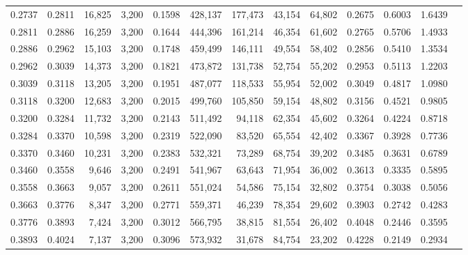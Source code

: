 \begin{tabular}{rrrrrrrrrrrrr}
0.2737 & 0.2811 & 16,825 & 3,200 &                                     0.1598 & 428,137 & 177,473 &  43,154 &  64,802 & 0.2675 & 0.6003 & 1.6439 \\
0.2811 & 0.2886 & 16,259 & 3,200 &                                     0.1644 & 444,396 & 161,214 &  46,354 &  61,602 & 0.2765 & 0.5706 & 1.4933 \\
0.2886 & 0.2962 & 15,103 & 3,200 &                                     0.1748 & 459,499 & 146,111 &  49,554 &  58,402 & 0.2856 & 0.5410 & 1.3534 \\
0.2962 & 0.3039 & 14,373 & 3,200 &                                     0.1821 & 473,872 & 131,738 &  52,754 &  55,202 & 0.2953 & 0.5113 & 1.2203 \\
0.3039 & 0.3118 & 13,205 & 3,200 &                                     0.1951 & 487,077 & 118,533 &  55,954 &  52,002 & 0.3049 & 0.4817 & 1.0980 \\
0.3118 & 0.3200 & 12,683 & 3,200 &                                     0.2015 & 499,760 & 105,850 &  59,154 &  48,802 & 0.3156 & 0.4521 & 0.9805 \\
0.3200 & 0.3284 & 11,732 & 3,200 &                                     0.2143 & 511,492 &  94,118 &  62,354 &  45,602 & 0.3264 & 0.4224 & 0.8718 \\
0.3284 & 0.3370 & 10,598 & 3,200 &                                     0.2319 & 522,090 &  83,520 &  65,554 &  42,402 & 0.3367 & 0.3928 & 0.7736 \\
0.3370 & 0.3460 & 10,231 & 3,200 &                                     0.2383 & 532,321 &  73,289 &  68,754 &  39,202 & 0.3485 & 0.3631 & 0.6789 \\
0.3460 & 0.3558 &  9,646 & 3,200 &                                     0.2491 & 541,967 &  63,643 &  71,954 &  36,002 & 0.3613 & 0.3335 & 0.5895 \\
0.3558 & 0.3663 &  9,057 & 3,200 &                                     0.2611 & 551,024 &  54,586 &  75,154 &  32,802 & 0.3754 & 0.3038 & 0.5056 \\
0.3663 & 0.3776 &  8,347 & 3,200 &                                     0.2771 & 559,371 &  46,239 &  78,354 &  29,602 & 0.3903 & 0.2742 & 0.4283 \\
0.3776 & 0.3893 &  7,424 & 3,200 &                                     0.3012 & 566,795 &  38,815 &  81,554 &  26,402 & 0.4048 & 0.2446 & 0.3595 \\
0.3893 & 0.4024 &  7,137 & 3,200 &                                     0.3096 & 573,932 &  31,678 &  84,754 &  23,202 & 0.4228 & 0.2149 & 0.2934 \\

\end{tabular}
